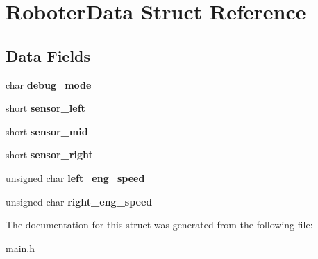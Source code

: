\hypertarget{structRoboterData}{}\section{Roboter\+Data Struct Reference}
\label{structRoboterData}
\subsection*{Data Fields}
\begin{DoxyCompactItemize}
\item 
\mbox{\label{structRoboterData_ace2f158d5f68533ef246dd213a29bd9f}} 
char {\bfseries debug\+\_\+mode}
\item 
\mbox{\label{structRoboterData_a7453a375faae88837594be36f144a943}} 
short {\bfseries sensor\+\_\+left}
\item 
\mbox{\label{structRoboterData_a5ddaf1c12ce3ea0517015c9ded71e17a}} 
short {\bfseries sensor\+\_\+mid}
\item 
\mbox{\label{structRoboterData_ab40da1c743f997569bf64300e42570a1}} 
short {\bfseries sensor\+\_\+right}
\item 
\mbox{\label{structRoboterData_a36c0359086a8902cbbc7da8e56f2c35f}} 
unsigned char {\bfseries left\+\_\+eng\+\_\+speed}
\item 
\mbox{\label{structRoboterData_aafcb7569d083d3417ab734aa787fff79}} 
unsigned char {\bfseries right\+\_\+eng\+\_\+speed}
\end{DoxyCompactItemize}


The documentation for this struct was generated from the following file\+:\begin{DoxyCompactItemize}
\item 
\hyperlink{main_8h}{main.\+h}\end{DoxyCompactItemize}
